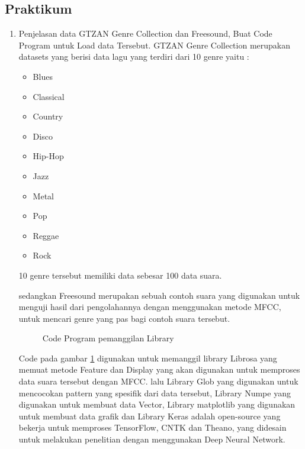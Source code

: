 \subsection{Praktikum}
\begin{enumerate}
\item Penjelasan data GTZAN Genre Collection dan Freesound, Buat Code Program untuk Load data Tersebut.
\subitem GTZAN Genre Collection merupakan datasets yang berisi data lagu yang terdiri dari 10 genre yaitu :
\begin{itemize}
\item Blues
\item Classical
\item Country
\item Disco
\item Hip-Hop
\item Jazz
\item Metal
\item Pop
\item Reggae
\item Rock
\end{itemize}
10 genre tersebut memiliki data sebesar 100 data suara.

\subitem sedangkan Freesound merupakan sebuah contoh suara yang digunakan untuk menguji hasil dari pengolahannya dengan menggunakan metode MFCC, untuk mencari genre yang pas bagi contoh suara tersebut.

\begin{figure}[!htbp]
      \caption{Code Program pemanggilan Library}
      \label{data10}
\end{figure}

\subitem Code pada gambar \ref{data10} digunakan untuk memanggil library Librosa yang memuat metode Feature dan Display yang akan digunakan untuk memproses data suara tersebut dengan MFCC. lalu Library Glob yang digunakan untuk mencocokan pattern yang spesifik dari data tersebut, Library Numpe yang digunakan untuk membuat data Vector, Library matplotlib yang digunakan untuk membuat data grafik dan Library Keras adalah open-source yang bekerja untuk memproses TensorFlow, CNTK dan Theano, yang didesain untuk melakukan penelitian dengan menggunakan Deep Neural Network.


\end{enumerate}
